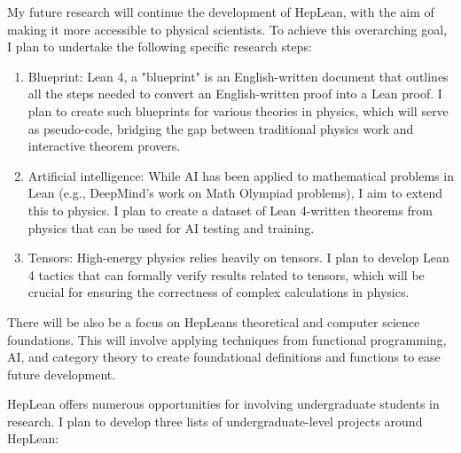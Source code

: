 \documentclass[12pt,letter]{article}
\newcounter{customtitle}
\begin{document}
My future research will continue the development of HepLean, with the aim of making it more accessible to physical scientists.  
To achieve this overarching goal, I plan to undertake the following specific research steps:
\begin{enumerate}
\item Blueprint:  Lean 4, a "blueprint" is an English-written document that outlines all the steps needed to convert an English-written proof into a Lean proof. I plan to create such blueprints for various theories in physics, which will serve as pseudo-code, bridging the gap between traditional physics work and interactive theorem provers.
\item Artificial intelligence: While AI has been applied to mathematical problems in Lean (e.g., DeepMind's work on Math Olympiad problems), I aim to extend this to physics. I plan to create a dataset of Lean 4-written theorems from physics that can be used for AI testing and training.
\item Tensors: High-energy physics relies heavily on tensors. I plan to develop Lean 4 tactics that can formally verify results related to tensors, which will be crucial for ensuring the correctness of complex calculations in physics.
\end{enumerate}

There will be also be a focus on HepLeans theoretical and computer science foundations. This will involve applying techniques from functional programming, AI, and category theory to create foundational definitions and functions to ease future development.


HepLean offers numerous opportunities for involving undergraduate students in research. I plan to develop three lists of undergraduate-level projects around HepLean:
\end{document}
